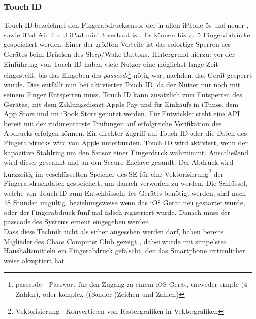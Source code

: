 	\subsubsection{Touch ID}\label{sec:touch_id}
		Touch ID bezeichnet den Fingerabdrucksensor der in allen iPhone 5s und neuer
		, sowie iPad Air 2 und iPad mini 3 verbaut ist. Es können bis zu 5
		Fingerabdrücke gespeichert werden. Einer der größten Vorteile ist das
		sofortige Sperren des Gerätes beim Drücken des Sleep/Wake-Buttons.
		Hintergrund hierzu: vor der Einführung von Touch ID haben viele Nutzer eine
		möglichst lange Zeit eingestellt, bis das Eingeben des \textsl{passcode}\footnote{passcode -
		Passwort für den Zugang zu einem iOS Gerät, entweder simple (4 Zahlen), oder
		komplex ((Sonder-)Zeichen und Zahlen)} nötig war, nachdem das Gerät gesperrt
		wurde. Dies entfällt nun bei aktivierter Touch ID, da der Nutzer nur noch mit
		seinem Finger Entsperren muss.
		Touch ID kann zusätzlich zum Entsperren des Gerätes, mit dem Zahlungsdienst
		Apple Pay und für Einkäufe in iTunes, dem App Store und im iBook Store genutzt
		werden. Für Entwickler steht eine API bereit mit der rudimentärste
		Prüfungen auf erfolgreiche Verifikation des Abdrucks erfolgen können. Ein
		direkter Zugriff auf Touch ID oder die Daten des Fingerabdrucks wird von
		Apple unterbunden. Touch ID wird aktiviert, wenn der kapazitive Stahlring um
		den Sensor einen Fingerdruck wahrnimmt. Anschließend wird dieser gescannt und
		an den Secure Enclave gesandt. Der Abdruck wird kurzzeitig im veschlüsselten
		Speicher des SE für eine Vektorisierung\footnote{Vektorisierung - Konvertieren
		von Rastergrafiken in Vektorgrafiken} der Fingerabdruckdaten gespeichert, um
		danach verworfen zu werden.
		Die Schlüssel, welche von Touch ID zum Entschlüsseln des Gerätes benötigt
		werden, sind nach 48 Stunden ungültig, beziehungsweise wenn das iOS Gerät neu
		gestartet wurde, oder der Fingerabdruck fünf mal falsch registriert wurde.
		Danach muss der passcode des Systems erneut eingegeben werden.\\
		Dass diese Technik nicht als sicher angesehen werden darf, haben bereits
		Miglieder des Chaos Computer Club gezeigt \cite{CCCBreakTouch2015}, dabei 
		wurde mit simpelsten Haushaltsmitteln ein Fingerabdruck gefälscht, den das
		Smartphone irrtümlicher weise akzeptiert hat.
